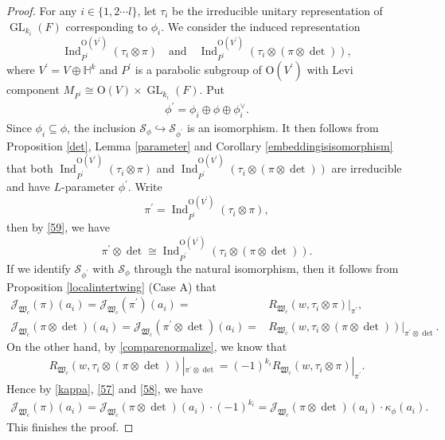 \documentclass[article]{article}
\numberwithin{equation}{section}
\theoremstyle{definition}
\DeclareMathOperator{\Ind}{Ind}
\DeclareMathOperator{\GL}{GL}
\begin{document}
\begin{proof}
 For any $i\in \{1,2\cdots l\}$, let $\tau_{i}$ be the irreducible unitary representation of $\GL_{k_{i}}(F)$ corresponding to  $\phi_{i}$. We consider the induced representation $$\Ind_{P^\prime}^{\mathrm O(V^\prime)}(\tau_i\otimes\pi)\quad \mbox{and}\quad \Ind_{P^\prime}^{\mathrm O(V^\prime)}(\tau_i\otimes(\pi\otimes \det)),$$
 where $V^\prime= V\oplus \mathbb H^k$  and $P^\prime$ is a parabolic subgroup of $\mathrm O(V^\prime)$ with Levi component $M_{P^\prime}\cong \mathrm O(V)\times \GL_{k_{i}}(F)$. Put
	\begin{align*}
	\phi^\prime =\phi_i \oplus \phi \oplus \phi_i^{\vee}.
	\end{align*}
	Since $\phi_i\subseteq \phi$, the inclusion $\mathcal {S}_{\phi}\hookrightarrow \mathcal S_{\phi^\prime}$ is an isomorphism. It then follows from Proposition \ref{det}, Lemma \ref{parameter} and Corollary \ref{embeddingisisomorphism} that both $\Ind_{P^\prime}^{\mathrm O(V^\prime)}(\tau_i\otimes\pi)$ and  $\Ind_{P^\prime}^{\mathrm O(V^\prime)}(\tau_i\otimes(\pi\otimes\det))$ are irreducible and have $L$-parameter $\phi^\prime$. Write $$\pi^\prime = \Ind_{P^\prime}^{\mathrm O(V^\prime)}(\tau_i\otimes\pi),$$
	then by \ref{59}, we have 
  $$\pi^\prime\otimes\det \cong \Ind_{P^\prime}^{\mathrm O(V^\prime)}(\tau_i\otimes(\pi\otimes\det)).$$ If we identify $\mathcal S_{\phi^\prime}$ with $\mathcal {S}_{\phi}$ through the natural isomorphism, then it follows from Proposition \ref{localintertwing} (Case A) that 
\begin{equation}\label{57}
\begin{aligned}
\mathcal J_{\mathfrak W_c}(\pi)(a_i)=\mathcal J_{\mathfrak W_c}(\pi^\prime)(a_i)=&R_{\mathfrak W_c}(w,\tau_{i}\otimes\pi)|_{\pi^\prime},\\
\mathcal J_{\mathfrak W_c}(\pi\otimes\det)(a_i)=\mathcal J_{\mathfrak W_c}(\pi^\prime\otimes\det)(a_i)=&R_{\mathfrak W_c}(w,\tau_{i}\otimes(\pi\otimes\det))|_{\pi^\prime\otimes\det}.
\end{aligned}
\end{equation}
On the other hand, by \ref{comparenormalize}, we know that 
	\begin{align}\label{58}
	 R_{\mathfrak W_c}(w,\tau_{i}\otimes(\pi\otimes\det))|_{\pi^\prime\otimes\det}=(-1)^{k_i} R_{\mathfrak W_c}(w,\tau_{i}\otimes\pi)|_{\pi^\prime}.
	\end{align}
Hence by \ref{kappa}, \ref{57} and \ref{58}, we have 
	\begin{align*}
	\mathcal J_{\mathfrak W_c}(\pi)(a_i)= \mathcal J_{\mathfrak W_c}(\pi\otimes\det)(a_i)\cdot (-1)^{k_i}=  \mathcal J_{\mathfrak W_c}(\pi\otimes\det)(a_i)\cdot \kappa_{\phi}(a_i). 
	\end{align*}
This finishes the proof. 	
\end{proof}
\end{document}
